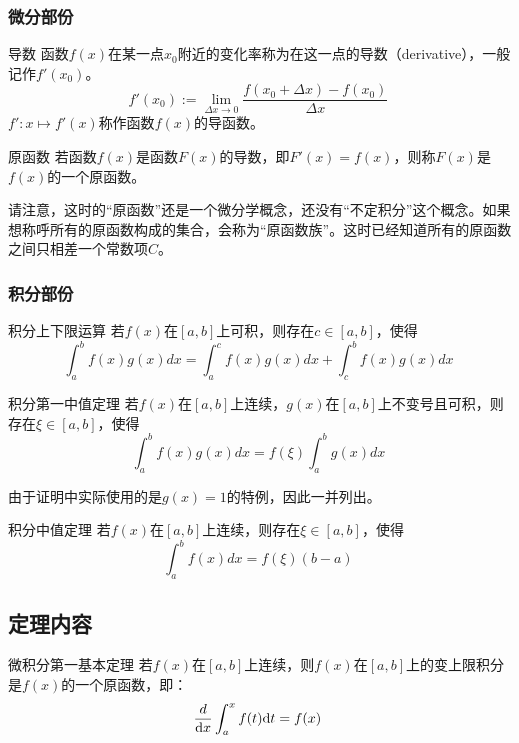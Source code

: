 \subsubsection{微分部份}
\begin{definition}{导数}\label{def_FTcalc_2}
函数$f(x)$在某一点$x_0$附近的变化率称为在这一点的导数（derivative），一般记作$f'(x_0)$。
$$f'(x_0):=\lim_{\Delta x\to0}{\frac{f(x_0+\Delta x)-f(x_0)}{\Delta x}}~$$
$f':x\mapsto f'(x)$称作函数$f(x)$的导函数。
\end{definition}

\begin{definition}{原函数}\label{def_FTcalc_3}
若函数$f(x)$是函数$F(x)$的导数，即$F'(x)=f(x)$，则称$F(x)$是$f(x)$的一个原函数。
\end{definition}

请注意，这时的“原函数”还是一个微分学概念，还没有“不定积分”这个概念。如果想称呼所有的原函数构成的集合，会称为“原函数族”。这时已经知道所有的原函数之间只相差一个常数项$C$。

\subsubsection{积分部份}

\begin{lemma}{积分上下限运算}\label{lem_FTcalc_1}
若$f(x)$在$[a,b]$上可积，则存在$c\in[a,b]$，使得
$$\int_{a}^{b} f(x)g(x)dx=\int_{a}^{c} f(x)g(x)dx+\int_{c}^{b} f(x)g(x)dx~$$
\end{lemma}

\begin{lemma}{积分第一中值定理}
若$f(x)$在$[a,b]$上连续，$g(x)$在$[a,b]$上不变号且可积，则存在$\xi\in[a,b]$，使得
$$\int_{a}^{b} f(x)g(x)dx=f(\xi)\int_{a}^{b} g(x)dx~$$
\end{lemma}

由于证明中实际使用的是$g(x)=1$的特例，因此一并列出。

\begin{lemma}{积分中值定理}\label{lem_FTcalc_2}
若$f(x)$在$[a,b]$上连续，则存在$\xi\in[a,b]$，使得
$$\int_{a}^{b} f(x)dx=f(\xi)(b-a)~$$
\end{lemma}

\subsection{定理内容}

\begin{theorem}{微积分第一基本定理}
若$f(x)$在$[a,b]$上连续，则$f(x)$在$[a,b]$上的变上限积分是$f(x)$的一个原函数，即：
$${d\over\mathrm {d}x}\int_{a}^{x}f(t)\mathrm {d}t=f(x)~$$
\end{theorem}

